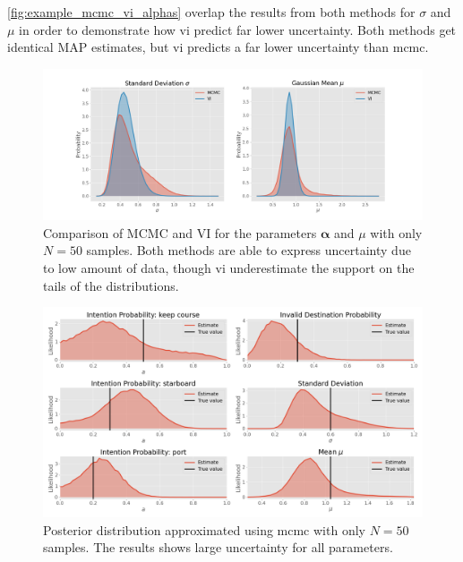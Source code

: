 \cref{fig:example_mcmc_vi_alphas} overlap the results from both methods for $\sigma$ and $\mu$ in order to demonstrate how \acrshort{vi} predict far lower uncertainty. Both methods get identical MAP estimates, but \acrshort{vi} predicts a far lower uncertainty than \acrshort{mcmc}. 

\begin{figure}[h]
    \centering
    \includegraphics[width=\textwidth]{figures/example_vi_mcmc_comparison_low_N.png}
    \caption{Comparison of MCMC and VI for the parameters $\boldsymbol{\alpha}$ and $\mu$ with only $N=50$ samples. Both methods are able to express uncertainty due to low amount of data, though \acrshort{vi} underestimate the support on the tails of the distributions.}
    \label{fig:example_mcmc_vi_low_N}
\end{figure}

\begin{figure}[h]
    \centering
    \includegraphics[width=\textwidth]{figures/example_mcmc_low_N.png}
    \caption{Posterior distribution approximated using \acrshort{mcmc} with only $N=50$ samples. The results shows large uncertainty for all parameters.}
    \label{fig:example_mcmc_low_N}
\end{figure}

